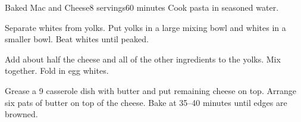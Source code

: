 \documentclass[../Cookbook.tex]{subfiles}
\begin{document}
\begin{recipe}[BakedMacAndCheese]{Baked Mac and Cheese}{8 servings}{60 minutes}
	Cook pasta in seasoned water.

	Separate whites from yolks. Put yolks in a large mixing bowl and whites in a smaller bowl.
	Beat whites until peaked.

	Add about half the cheese and all of the other ingredients to the yolks. Mix together.
	Fold in egg whites.

	Grease a 9 casserole dish with butter and put remaining cheese on top. Arrange six pats of butter on top of the cheese.
	Bake at  35--40 minutes until edges are browned.
\end{recipe}
\end{document}
